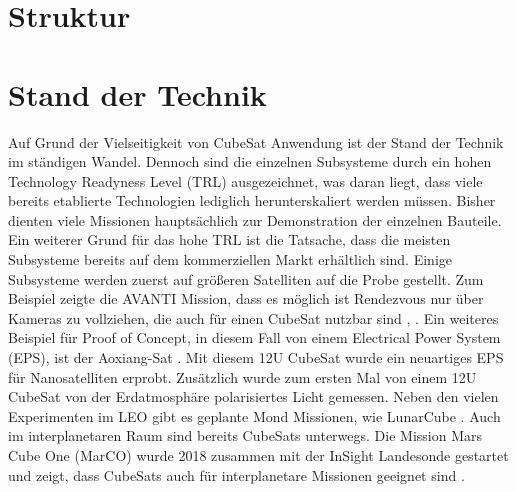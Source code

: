 		\section{Struktur}
		


		\section{Stand der Technik}
Auf Grund der Vielseitigkeit von CubeSat Anwendung ist der Stand der Technik im ständigen Wandel. Dennoch sind die einzelnen Subsysteme durch ein hohen Technology Readyness Level (TRL) ausgezeichnet, was daran liegt, dass viele bereits etablierte Technologien lediglich herunterskaliert werden müssen.
Bisher dienten viele Missionen hauptsächlich zur Demonstration der einzelnen Bauteile. Ein weiterer Grund für das hohe TRL ist die Tatsache, dass die meisten Subsysteme bereits auf dem kommerziellen Markt erhältlich sind.
Einige Subsysteme werden zuerst auf größeren Satelliten auf die Probe gestellt. Zum Beispiel zeigte die AVANTI Mission, dass es möglich ist Rendezvous nur über Kameras zu vollziehen, die auch für einen CubeSat nutzbar sind \cite{Gaias.2018}, \cite{Gaias.2018b}. Ein weiteres Beispiel für Proof of Concept, in diesem Fall von einem Electrical Power System (EPS), ist der Aoxiang-Sat \cite{Peng.2018}. Mit diesem 12U CubeSat wurde ein neuartiges EPS für Nanosatelliten erprobt. Zusätzlich wurde zum ersten Mal von einem 12U CubeSat von der Erdatmosphäre polarisiertes Licht gemessen.
Neben den vielen Experimenten im LEO gibt es geplante Mond Missionen, wie LunarCube \cite{}. Auch im interplanetaren Raum sind bereits CubeSats unterwegs. Die Mission Mars Cube One (MarCO) wurde 2018 zusammen mit der InSight Landesonde gestartet und zeigt, dass CubeSats auch für interplanetare Missionen geeignet sind \cite{}.


